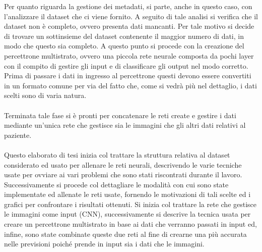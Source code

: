Per quanto riguarda la gestione dei metadati, si parte, anche in questo caso, con l'analizzare il dataset che ci viene fornito.
A seguito di tale analisi si verifica che il dataset non è completo, ovvero presenta dati mancanti. Per tale motivo si decide di 
trovare un sottinsieme del dataset contenente il maggior numero di dati, in modo che questo sia completo.
A questo punto si procede con la creazione del percettrone multistrato, ovvero una piccola rete neurale composta da pochi layer con il compito 
di gestire gli input e di classificare gli output nel modo corretto.
Prima di passare i dati in ingresso al percettrone questi devono essere convertiti in un formato comune per via del fatto che, come si vedrà 
più nel dettaglio, i dati scelti sono di varia natura.
\\\\
Terminata tale fase si è pronti per concatenare le reti create e gestire i dati mediante un'unica rete che gestisce sia le immagini che gli altri dati 
relativi al paziente.
\\\\
Questo elaborato di tesi inizia col trattare la struttura relativa al dataset considerato ed usato per allenare le 
reti neurali, descrivendo le varie tecniche usate per ovviare ai vari problemi che sono stati riscontrati durante il lavoro.
Successivamente si procede col dettagliare le modalità con cui sono state implementate ed allenate le reti usate, fornendo le motivazioni
di tali scelte ed i grafici per confrontare i risultati ottenuti.
Si inizia col trattare la rete che gestisce le immagini come input (CNN), successivamente si descrive la tecnica usata per creare 
un percettrone multistrato in base ai dati che verranno passati in input ed, infine, sono state combinate queste due reti al fine 
di crearne una più accurata nelle previsioni poiché prende in input sia i dati che le immagini.  